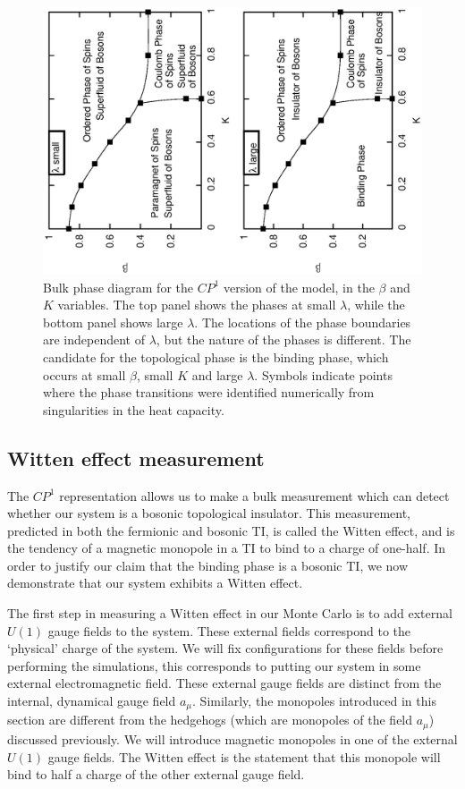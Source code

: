 \documentclass[prb,twocolumn]{revtex4-1}
\newcommand{\cp}{$CP^1$ }
\begin{document}
\begin{figure}
\includegraphics[angle=-90,width=0.9\linewidth]{figures/cp1bulkphase.eps}
\caption{Bulk phase diagram for the $CP^1$ version of the model, in the $\beta$ and $K$ variables. The top panel shows the phases at small $\lambda$, while the bottom panel shows large $\lambda$. The locations of the phase boundaries are independent of $\lambda$, but the nature of the phases is different. The candidate for the topological phase is the binding phase, which occurs at small $\beta$, small $K$ and large $\lambda$. Symbols indicate points where the phase transitions were identified numerically from singularities in the heat capacity.}
\label{cp1bulkphase}
\end{figure}

\subsection{Witten effect measurement}
The \cp representation allows us to make a bulk measurement which can detect whether our system is a bosonic topological insulator. This measurement, predicted in both the fermionic\cite{FranzWitten} and bosonic\cite{MaxWitten} TI, is called the Witten effect, and is the tendency of a magnetic monopole in a TI to bind to a charge of one-half. 
In order to justify our claim that the binding phase is a bosonic TI, we now demonstrate that our system exhibits a Witten effect. 

The first step in measuring a Witten effect in our Monte Carlo is to add external $U(1)$ gauge fields to the system. These external fields correspond to the `physical' charge of the system. We will fix configurations for these fields before performing the simulations, this corresponds to putting our system in some external electromagnetic field. These external gauge fields are distinct from the internal, dynamical gauge field $a_\mu$. Similarly, the monopoles introduced in this section are different from the hedgehogs (which are monopoles of the field $a_\mu$) discussed previously. We will introduce magnetic monopoles in one of the external $U(1)$ gauge fields. The Witten effect is the statement that this monopole will bind to half a charge of the other external gauge field.
\end{document}
